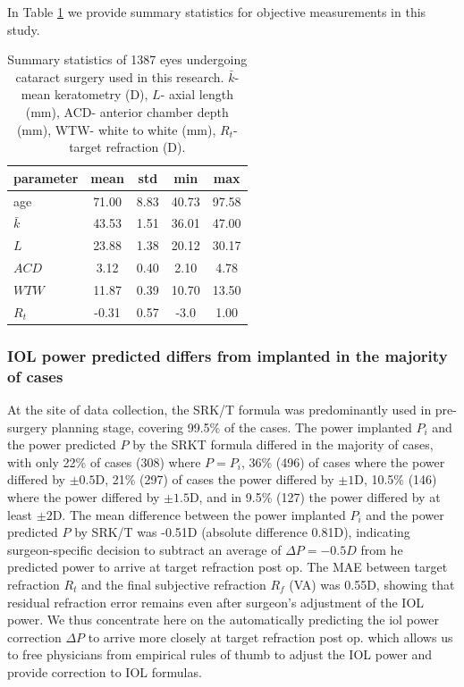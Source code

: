 \documentclass[article,twocolumn,preprint,10pt]{paper}%
\renewcommand{\(}{\left(}
\renewcommand{\)}{\right)}
\renewcommand{\[}{\left[}
\renewcommand{\]}{\right]}
\newcommand{\1}{\mbox{\boldmath$1$}}
\begin{document}
In Table \ref{table:summaryStatistics} we provide summary statistics for objective measurements in this study.
\begin{table}
	\begin{tabular}{l|c|c|c|c}
		parameter	   	&mean& std& min& max \\
		\hline 
		\hline
		age           & 71.00   & 8.83  & 40.73 & 97.58\\
		$\bar{k}$  & 43.53  & 1.51   & 36.01  & 47.00\\
		$L$           & 23.88  & 1.38  & 20.12  & 30.17\\
		$ACD$	   & 3.12    & 0.40  & 2.10    & 4.78\\
		$WTW$ 	 & 11.87   & 0.39  & 10.70  & 13.50\\
		$R_t$	    & -0.31   & 0.57  & -3.0    & 1.00 \\		
	\end{tabular} 
	\caption{Summary statistics of 1387 eyes undergoing cataract surgery used in this research. $\bar{k}$- mean keratometry (D), $L$- axial length (mm), ACD- anterior chamber depth (mm), WTW- white to white (mm), $R_t$- target refraction (D).}
	\label{table:summaryStatistics}
\end{table}
\subsubsection{ IOL power predicted differs from implanted in the majority of cases}
At the site of data collection, the SRK/T formula was predominantly used in pre-surgery planning stage, covering 99.5\% of the cases. The power implanted $P_i$ and the power predicted  $P$ by the SRKT formula differed in the majority of cases, with only 22\% of cases (308) where $P=P_i$,  36\% (496) of cases where the power differed by $\pm 0.5$D, 21\% (297) of cases the power differed by $\pm1$D, 10.5\% (146) where the power differed by $\pm1.5$D, and in 9.5\% (127) the power differed by at least $\pm2$D. 
The mean difference between the power implanted $P_i$  and the power predicted $P$ by SRK/T was -0.51D (absolute difference 0.81D), indicating surgeon-specific decision to subtract an average of $\Delta P=-0.5D$ from he predicted power to arrive at target refraction post op. 
The MAE between target refraction $R_t$ and the final subjective refraction $R_f$ (VA) was 0.55D, showing that residual refraction error remains even after surgeon's adjustment of the IOL power. We thus concentrate here on the automatically predicting the iol power correction $\Delta P$ to arrive more closely at target refraction post op. which allows us to free physicians from empirical rules of thumb to adjust the IOL power and provide correction to IOL formulas. 
\end{document}
